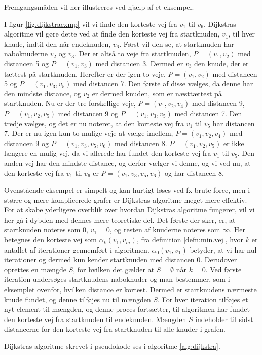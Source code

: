 \begin{exmp}
Fremgangsmåden vil her illustreres ved hjælp af et eksempel.

I figur \ref{fig.dijkstraexmp} vil vi finde den korteste vej fra $v_{1}$ til $v_{6}$. Dijkstras algoritme vil gøre dette ved at finde den korteste vej fra startknuden, $v_{1}$, til hver knude, indtil den når endeknuden, $v_{6}$. Først vil den se, at startknuden har naboknuderne $v_{2}$ og $v_{3}$. Der er altså to veje fra startknuden, $P=(v_{1},v_{2})$ med distancen 5 og $P=(v_{1},v_{3})$ med distancen 3. Dermed er $v_{3}$ den knude, der er tættest på startknuden. Herefter er der igen to veje, $P=(v_{1},v_{2})$ med distancen 5 og $P=(v_{1},v_{3},v_{5})$ med distancen 7. Den første af disse vælges, da denne har den mindste distance, og $v_{2}$ er dermed knuden, som er næsttættest på startknuden. Nu er der tre forskellige veje, $P=(v_{1},v_{2}, v_{4})$ med distancen 9, $P=(v_{1},v_{2}, v_{5})$ med distancen 9 og $P=(v_{1},v_{3}, v_{5})$ med distancen 7. Den tredje vælges, og det er nu noteret, at den korteste vej fra $v_{1}$ til $v_{5}$ har distancen 7. Der er nu igen kun to mulige veje at vælge imellem, $P=(v_{1},v_{2}, v_{4})$ med distancen 9 og $P=(v_{1},v_{3}, v_{5}, v_{6})$ med distancen 8. $P=(v_{1},v_{2}, v_{5})$ er ikke længere en mulig vej, da vi allerede har fundet den korteste vej fra $v_{1}$ til $v_{5}$. Den anden vej har den mindste distance, og derfor vælger vi denne, og vi ved nu, at den korteste vej fra $v_{1}$ til $v_{6}$ er $P=(v_{1},v_{3}, v_{5}, v_{6})$ og har distancen 8.
\end{exmp}
Ovenstående eksempel er simpelt og kan hurtigt løses ved fx brute force, men i større og mere komplicerede grafer er Dijkstras algoritme meget mere effektiv. For at skabe yderligere overblik over hvordan Dijkstras algoritme fungerer, vil vi her gå i dybden med dennes mere teoretiske del. Det første der sker, er, at startknuden noteres som $0$, $v_{1} = 0$, og resten af knuderne noteres som $\infty$. Her betegnes den korteste vej som $\alpha_{k}(v_1,v_m)$, fra definition \ref{defn:min.vej}, hvor $k$ er antallet af iterationer gennemført i algoritmen. $\alpha_{0}(v_1,v_1)$ betyder, at vi har nul iterationer og dermed kun kender startknuden med distancen 0. Derudover oprettes en mængde $S$, for hvilken det gælder at $S = \emptyset$ når $k = 0$. Ved første iteration undersøges startknudens naboknuder og man bestemmer, som i eksemplet ovenfor, hvilken distance er kortest. Dermed er startknudens nærmeste knude fundet, og denne tilføjes nu til mængden $S$. For hver iteration tilføjes et nyt element til mængden, og denne proces fortsætter, til algoritmen har fundet den korteste vej fra startknuden til endeknuden. Mængden $S$ indeholder til sidst distancerne for den korteste vej fra startknuden til alle knuder i grafen. 

Dijkstras algoritme skrevet i pseudokode ses i algoritme \ref{alg:dijkstra}.
